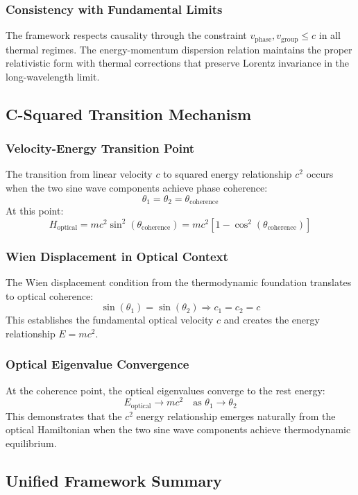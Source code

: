 ﻿\documentclass[12pt]{article}
\begin{document}
\subsubsection{Consistency with Fundamental Limits}
The framework respects causality through the constraint $v_{\text{phase}}, v_{\text{group}} \le c$ in all thermal regimes. The energy-momentum dispersion relation maintains the proper relativistic form with thermal corrections that preserve Lorentz invariance in the long-wavelength limit.

\subsection{C-Squared Transition Mechanism}

\subsubsection{Velocity-Energy Transition Point}
The transition from linear velocity $c$ to squared energy relationship $c^2$ occurs when the two sine wave components achieve phase coherence:
$$\theta_1 = \theta_2 = \theta_{\text{coherence}}$$
At this point:
$$H_{\text{optical}} = mc^2\sin^2(\theta_{\text{coherence}}) = mc^2[1 - \cos^2(\theta_{\text{coherence}})]$$

\subsubsection{Wien Displacement in Optical Context}
The Wien displacement condition from the thermodynamic foundation translates to optical coherence:
$$\sin(\theta_1) = \sin(\theta_2) \Rightarrow c_1 = c_2 = c$$
This establishes the fundamental optical velocity $c$ and creates the energy relationship $E = mc^2$.

\subsubsection{Optical Eigenvalue Convergence}
At the coherence point, the optical eigenvalues converge to the rest energy:
$$E_{\text{optical}} \rightarrow mc^2 \quad \text{as } \theta_1 \rightarrow \theta_2$$
This demonstrates that the $c^2$ energy relationship emerges naturally from the optical Hamiltonian when the two sine wave components achieve thermodynamic equilibrium.

\subsection{Unified Framework Summary}
\end{document}
